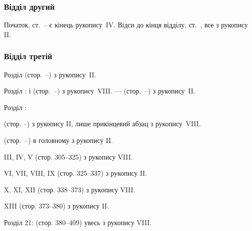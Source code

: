\subsubsection*{Відділ другий}

Початок, ст.~\pageref{original-104}--\pageref{original-112} є кінець рукопису~IV.
Відси до кінця відділу, ст.~\pageref{original-266}, все з рукопису II.

\subsubsection*{Відділ третій}

Розділ  (стор.~\pageref{original-267}--\pageref{original-273}) з рукопису~II.

\noindent{}Розділ :  і  (стор.~\pageref{original-274}--\pageref{original-298}) з рукопису~VIII.
—  (стор.~\pageref{original-298}--\pageref{original-300-1}) з рукопису~II.

\noindent{}Розділ :

 (стор. \pageref{original-300-2}--\pageref{original-302-1}) з рукопису II,
лише прикінцевий абзац з рукопису~VIII.

 (стор.~\pageref{original-303}--\pageref{original-305-1}) в головному з рукопису II.

III, IV, V (стор. 305--325) з рукопису VIII.

VI, VII, VIII, IX (стор. 325--337) з рукопису II.

X, XI, XII (стор. 338--373) з рукопису VIII.

XIII (стор. 373--380) з рукопису II.

\noindent{}Розділ 21: (стор. 380--409) увесь з рукопису VIII.



% 







\parbreak{}  %
